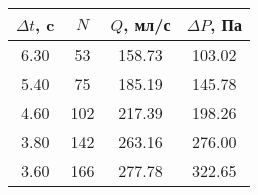 \begin{tabular}{c|c|c|c}
\toprule
$\Delta t$, c & $N$ & $Q$, мл/с & $\Delta P$, Па \\
\midrule
6.30 & 53 & 158.73 & 103.02 \\
5.40 & 75 & 185.19 & 145.78 \\
4.60 & 102 & 217.39 & 198.26 \\
3.80 & 142 & 263.16 & 276.00 \\
3.60 & 166 & 277.78 & 322.65 \\
\bottomrule
\end{tabular}
